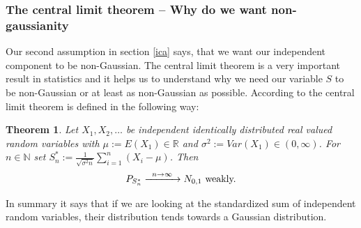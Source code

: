 \documentclass[12pt, a4paper]{article}
\newtheorem{Theorem}{Theorem}[section]
\numberwithin{equation}{section}
\numberwithin{figure}{section}
\numberwithin{table}{section}
\begin{document}
	\subsubsection{The central limit theorem -- Why do we want non-gaussianity} \label{ica:clt}
	Our second assumption in section \ref{ica} says, that we want our independent component to be non-Gaussian.
	The central limit theorem is a very important result in statistics and it helps us to understand why we need our variable $S$ to be non-Gaussian or at least as non-Gaussian as possible. According to \citet{wtheorie}
	the central limit theorem is defined in the following way:
	\begin{Theorem}
		Let \mbox{$X_1,X_2,\dots$} be independent identically distributed real valued random variables with \mbox{$\mu := E\left(X_1\right) \in \mathbb{R}$} and \mbox{$\sigma^2 := Var\left(X_1\right) \in \left(0,\infty\right)$}. For \mbox{$n \in \mathbb{N}$} set \mbox{$S^*_n := \frac{1}{\sqrt{\sigma^2n}}\sum_{i=1}^{n}\left(X_i-\mu\right)$}. Then
		\begin{equation}
		P_{S^*_n} \xrightarrow{\enskip n \to \infty \enskip} N_{0,1} \text{ weakly.}
		\end{equation}
	\end{Theorem}
	In summary it says that if we are looking at the standardized sum of independent random variables, their distribution tends towards a Gaussian distribution.
	
\end{document}
